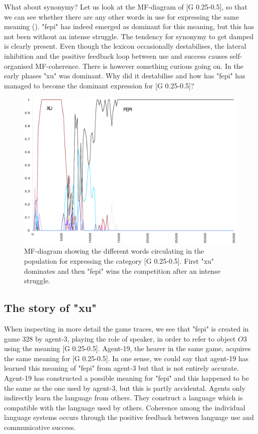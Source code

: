 What about synonymy? Let us look at the 
MF-diagram of [G 0.25-0.5], so that we can
see whether there are any other words in use for expressing
the same meaning ().
"fepi" has indeed emerged as dominant for this meaning, but 
this has not been without an intense struggle.
The tendency for synonymy to get damped is clearly present. 
Even though the lexicon occasionally destabilises, 
the lateral inhibition and the positive feedback loop between use 
and success causes self-organised MF-coherence. 
There is however something curious going on. 
In the early phases "xu" was dominant. Why did it 
destabilise and how has "fepi" has managed to become the
dominant expression for [G 0.25-0.5]? 
\begin{figure}[htbp]
  \centerline{\includegraphics[width=.80\textwidth]{chap7/figs/MF-G-025-050}}
\caption{ \label{g02505.f} MF-diagram showing the
different words circulating in the population for expressing
the category [G 0.25-0.5]. First "xu" dominates and 
then "fepi" wins the competition after an intense struggle.}
\end{figure}

\subsection{The story of "xu"}

When inspecting in more detail the game traces,
we see that "fepi" is created in game 328 by agent-3, playing the
role of speaker, in order to refer to object $O3$ using 
the meaning [G 0.25-0.5]. Agent-19, the hearer in the same 
game, acquires the same meaning for [G 0.25-0.5]. In one sense,
we could say that agent-19 has learned this meaning of "fepi" from
agent-3 but that is not entirely accurate. Agent-19 
has constructed a possible meaning for "fepi" and this happened
to be the same as the one used by agent-3,
but this is partly accidental. 
Agents only indirectly learn the language from others. They construct
a language which is compatible with the language used by others. 
Coherence among the individual
language systems occurs through the positive feedback between
language use and communicative success.

